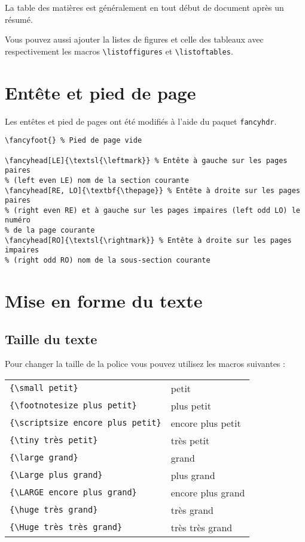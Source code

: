 \documentclass{rapport}
\begin{document}
      La table des matières est généralement en tout début de document après un résumé.

      Vous pouvez aussi ajouter la listes de figures et celle des tableaux avec respectivement les macros \verb$\listoffigures$ et \verb=\listoftables=.

    \section{Entête et pied de page}
      Les entêtes et pied de pages ont été modifiés à l'aide du paquet \verb:fancyhdr:. 
      \begin{verbatim}
\fancyfoot{} % Pied de page vide

\fancyhead[LE]{\textsl{\leftmark}} % Entête à gauche sur les pages paires 
% (left even LE) nom de la section courante
\fancyhead[RE, LO]{\textbf{\thepage}} % Entête à droite sur les pages paires 
% (right even RE) et à gauche sur les pages impaires (left odd LO) le numéro
% de la page courante
\fancyhead[RO]{\textsl{\rightmark}} % Entête à droite sur les pages impaires 
% (right odd RO) nom de la sous-section courante
\end{verbatim}
      
    \section{Mise en forme du texte}
      
      \subsection{Taille du texte}
        
        Pour changer la taille de la police vous pouvez utilisez les macros suivantes :
        
        \begin{tabular}{ll}
          \verb|{\small petit}| & {\small petit}\\
          \verb|{\footnotesize plus petit}| & {\footnotesize plus petit}\\
          \verb|{\scriptsize encore plus petit}| & {\scriptsize encore plus petit}\\
          \verb|{\tiny très petit}| & {\tiny très petit}\\
          \verb|{\large grand}| & {\large grand}\\
          \verb|{\Large plus grand}| & {\Large plus grand}\\
          \verb|{\LARGE encore plus grand}| & {\LARGE encore plus grand}\\
          \verb|{\huge très grand}| & {\huge très grand}\\
          \verb|{\Huge très très grand}| & {\Huge très très grand}
        \end{tabular}
        
\end{document}
